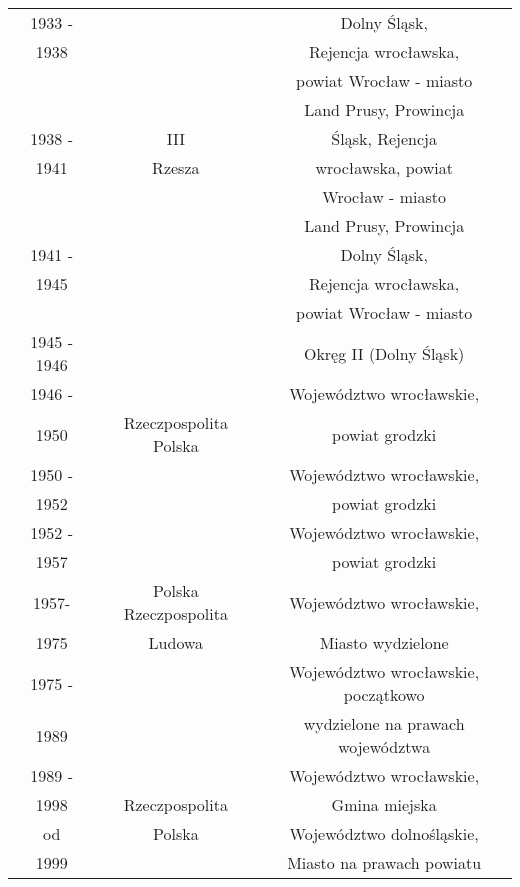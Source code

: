 \documentclass[12pt]{article}
\begin{document}
\begin{center}
\begin{longtable}{|c|c|c|c|}
\cellcolor{magenta}1933 - & \multicolumn{2}{c|}{} & Dolny Śląsk, \\
\cellcolor{magenta}1938 & \multicolumn{2}{c|}{} & Rejencja wrocławska, \\
\cellcolor{magenta} & \multicolumn{2}{c|}{} & powiat Wrocław - miasto \\
 \cline{1-1}\cline{4-4}
\cellcolor{magenta} & \multicolumn{2}{c|}{} & Land Prusy, Prowincja \\
\cellcolor{magenta}1938 - & \multicolumn{2}{c|}{III} & Śląsk, Rejencja \\
\cellcolor{magenta}1941 & \multicolumn{2}{c|}{Rzesza} & wrocławska, powiat \\
\cellcolor{magenta} & \multicolumn{2}{c|}{} & Wrocław - miasto \\
 \cline{1-1}\cline{4-4}
\cellcolor{magenta} & \multicolumn{2}{c|}{} & Land Prusy, Prowincja \\
\cellcolor{magenta}1941 - & \multicolumn{2}{c|}{} & Dolny Śląsk, \\
\cellcolor{magenta}1945 & \multicolumn{2}{c|}{} & Rejencja wrocławska, \\
\cellcolor{magenta} & \multicolumn{2}{c|}{} & powiat Wrocław - miasto \\
\hline
\cellcolor{red}1945 - 1946 & \multicolumn{2}{c|}{} & Okręg II (Dolny Śląsk) \\
\cline{1-1}\cline{4-4}
\cellcolor{red}1946 - & \multicolumn{2}{c|}{} & Województwo wrocławskie, \\
\cellcolor{red}1950 & \multicolumn{2}{c|}{Rzeczpospolita Polska} & powiat grodzki \\
\cline{1-1}\cline{4-4}
\cellcolor{red}1950 - & \multicolumn{2}{c|}{} & Województwo wrocławskie, \\
\cellcolor{red}1952 & \multicolumn{2}{c|}{} & powiat grodzki \\
\hline
\cellcolor{red}1952 - & \multicolumn{2}{c|}{} & Województwo wrocławskie, \\
\cellcolor{red}1957 & \multicolumn{2}{c|}{} & powiat grodzki \\
\cline{1-1}\cline{4-4}
\cellcolor{red}1957- & \multicolumn{2}{c|}{Polska Rzeczpospolita} & Województwo wrocławskie, \\
\cellcolor{red}1975 & \multicolumn{2}{c|}{Ludowa} & Miasto wydzielone \\
\cline{1-1}\cline{4-4}
\cellcolor{red}1975 - & \multicolumn{2}{c|}{} & Województwo wrocławskie, początkowo \\ 
\cellcolor{red}1989 & \multicolumn{2}{c|}{} & wydzielone na prawach województwa \\
\hline
\cellcolor{red}1989 - & \multicolumn{2}{c|}{} & Województwo wrocławskie, \\
\cellcolor{red}1998 & \multicolumn{2}{c|}{Rzeczpospolita} & Gmina miejska \\
\cline{1-1}\cline{4-4}
\cellcolor{red}od & \multicolumn{2}{c|}{Polska} & Województwo dolnośląskie, \\
\cellcolor{red}1999 & \multicolumn{2}{c|}{} & Miasto na prawach powiatu \\
\hline
\end{longtable}
\end{center}
\end{document}
